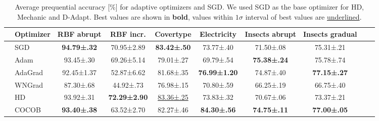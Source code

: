 \documentclass[runningheads]{llncs}
\begin{document}
\begin{table}[ht]
	\centering
	\scriptsize
	\caption{Average prequential accuracy [\%] for adaptive optimizers and SGD. We used SGD as the base optimizer for HD, Mechanic and D-Adapt. Best values are shown in \textbf{bold}, values within $1\sigma$ interval of best values are \underline{underlined}.}
	\begin{tabular}{llcccccccc}
		\toprule
		                                                   & Optimizer                                                                         & RBF abrupt          & RBF incr.            & Covertype             & Electricity          & Insects abrupt      & Insects gradual     \\
		\midrule
		\multirow{5}{*}{\rotatebox[origin=c]{90}{Tuned}}   & SGD                                                                               & \bfseries 94.79±.32 & 70.95±2.89           & \bfseries 83.42±.50   & 73.77±.40            & 71.50±.08           & 75.31±.21           \\
		                                                   & Adam \cite{kingmaAdamMethodStochastic2017b}                                       & 93.45±.30           & 69.26±5.14           & 79.01±.27             & 69.79±.54            & \bfseries 75.38±.24 & 75.78±.74           \\
		                                                   & AdaGrad \cite{duchiAdaptiveSubgradientMethods2011}                                & 92.45±1.37          & 52.87±6.62           & 81.68±.35             & \bfseries 76.99±1.20 & 74.87±.40           & \bfseries 77.15±.27 \\
		                                                   & WNGrad  \cite{wuWNGradLearnLearning2020}                                          & 87.30±.68           & 44.92±.73            & 76.98±.15             & 70.80±.59            & 66.25±.19           & 66.75±.40           \\
		                                                   & HD \cite{baydinOnlineLearningRate2018}                                            & 93.92±.31           & \bfseries 72.29±2.90 & \underline{83.36±.25} & 73.83±.32            & 70.67±.06           & 73.37±.21           \\ \midrule
		\multirow{4}{*}{\rotatebox[origin=c]{90}{LR-Free}} & COCOB                               \cite{orabonaTrainingDeepNetworks2017}        & \bfseries 93.40±.38 & 63.52±2.70           & 82.27±.46             & \bfseries 84.30±.56  & \bfseries 74.75±.11 & \bfseries 77.00±.05 \\

\end{tabular}
\end{table}
\end{document}
